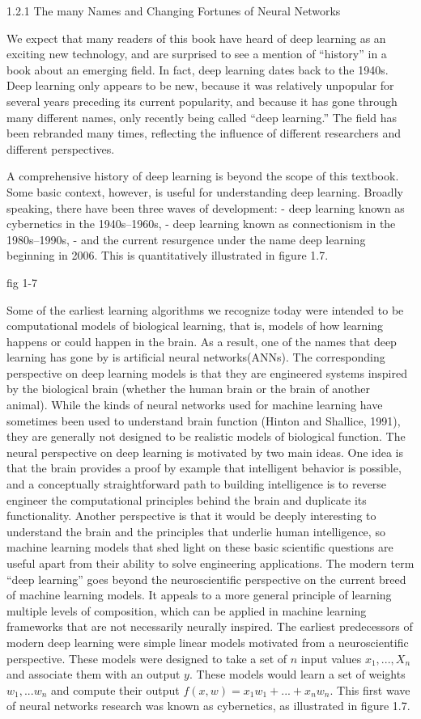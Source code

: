 \documentclass[11pt]{article}
\begin{document}
1.2.1 The many Names and Changing Fortunes of Neural Networks

We expect that many readers of this book have heard of deep learning as an exciting new technology, and are surprised to see a mention of “history” in a book about an emerging ﬁeld.
In fact, deep learning dates back to the 1940s.
Deep learning only appears to be new, because it was relatively unpopular for several years preceding its current popularity, and because it has gone through many different names, only recently being called “deep learning.”
The field has been rebranded many times, reflecting the influence of different researchers and different perspectives.

A comprehensive history of deep learning is beyond the scope of this textbook.
Some basic context, however, is useful for understanding deep learning.
Broadly speaking, there have been three waves of development:
- deep learning known as cybernetics in the 1940s–1960s,
- deep learning known as connectionism in the 1980s–1990s,
- and the current resurgence under the name deep learning beginning in 2006.
This is quantitatively illustrated in figure 1.7.

fig 1-7

Some of the earliest learning algorithms we recognize today were intended to be computational models of biological learning, that is, models of how learning happens or could happen in the brain.
As a result, one of the names that deep learning has gone by is artificial neural networks(ANNs).
The corresponding perspective on deep learning models is that they are engineered systems inspired by the biological brain (whether the human brain or the brain of another animal).
While the kinds of neural networks used for machine learning have sometimes been used to understand brain function (Hinton and Shallice, 1991), they are generally not designed to be realistic models of biological function.
The neural perspective on deep learning is motivated by two main ideas.
One idea is that the brain provides a proof by example that intelligent behavior is possible, and a conceptually straightforward path to building intelligence is to reverse engineer the computational principles behind the brain and duplicate its functionality.
Another perspective is that it would be deeply interesting to understand the brain and the principles that underlie human intelligence, so machine learning models that shed light on these basic scientific questions are useful apart from their ability to solve engineering applications.
The modern term “deep learning” goes beyond the neuroscientific perspective on the current breed of machine learning models.
It appeals to a more general principle of learning multiple levels of composition, which can be applied in machine learning frameworks that are not necessarily neurally inspired.
The earliest predecessors of modern deep learning were simple linear models motivated from a neuroscientific perspective.
These models were designed to take a set of $n$ input values $x_1,..., X_n$ and associate them with an output $y$.
These models would learn a set of weights $w_1,...w_n$ and compute their output $f(x,w) = x_1 w_1 + ... + x_n w_n$.
This first wave of neural networks research was known as cybernetics, as illustrated in figure 1.7.
\end{document}

